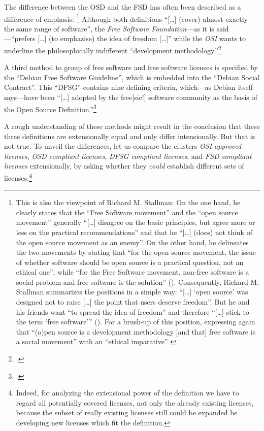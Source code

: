The difference between the OSD and the FSD has often been described as a
difference of emphasis:%
  \footnote{This is also the viewpoint of Richard M. Stallman: 
  On the one hand, he clearly states that the \enquote{Free Software
  movement} and the \enquote{open source movement} generally \enquote{[\ldots]
  disagree on the basic principles, but agree more or less on the practical
  recommendations} and that he \enquote{[\ldots] (does) not think of the open
  source movement as an enemy}.  On the other hand, he delineates the two
  movements by stating that \enquote{for the open source movement, the issue of
  whether software should be open source is a practical question, not an ethical
  one}, while \enquote{for the Free Software movement, non-free software is a
  social problem and free software is the solution}
  (\cite[cf.][55]{Stallman1998a}). \label{RmsFsPriority} Consequently, Richard
  M. Stallman summarizes the positions in a simple way: \enquote{[\ldots] `open
  source' was designed not to raise [\ldots] the point that users deserve
  freedom}. But he and his friends want \enquote{to spread the idea of freedom}
  and therefore \enquote{[\ldots] stick to the term `free software'}
  (\cite[][59]{Stallman1998a}). For a brush-up of this position, expressing
  again that \enquote{(o)pen source is a development methodology [and that] free
  software is a social movement} with an \enquote{ethical imparative}
  \cite[cf.][31]{Stallman2009a} }
Although both definitions \enquote{[\ldots]
(cover) almost exactly the same range of software}, the \emph{Free Software
Foundation}---as it is said---\enquote{prefers [\ldots] (to emphazise) the
idea of freedom [\ldots]} while the \emph{OSI} wants to underline the
philosophically indifferent \enquote{development methodology.}\footcite[pars pro
toto: cf.][232]{Fogel2006a}

A third method to group of free software and free software licenses is specified
by the \enquote{Debian Free Software Guideline}, which is embedded into the
\enquote{Debian Social Contract}. This \enquote{DFSG} contains nine defining
criteria, which---as Debian itself says---have been \enquote{[\ldots] adopted
by the free[sic!] software community as the basis of the Open Source
Definition.}\footcite[cf.][wp]{DFSG2013a}

A rough understanding of these methods might result in the conclusion that these
three definitions are extensionally equal and only differ intensionally.
But that is not true. To unveil the differences, let us compare the clusters
\emph{OSI approved licenses}, \emph{OSD compliant licenses}, \emph{DFSG
compliant licenses}, and \emph{FSD compliant licenses} extensionally, by asking
whether they \emph{could} establish different sets of licenses.\footnote{Indeed,
for analyzing the extensional power of the definition we have to regard all
potentially covered licenses, not only the already existing licenses, because
the subset of really existing licenses still could be expanded be developing new
licenses which fit the definition.}

